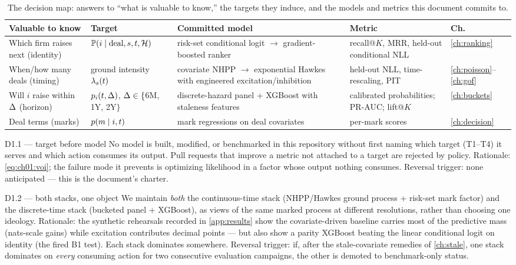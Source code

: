 \begin{table}[htbp]
\centering
\small
\begin{tabular}{p{} p{} p{} p{} p{}}
\toprule
\textbf{Valuable to know} & \textbf{Target} & \textbf{Committed model} &
\textbf{Metric} & \textbf{Ch.} \\
\midrule
Which firm raises next (identity) &
$\mathbb{P}(i \mid \text{deal}, s, t, \mathcal{H})$ &
risk-set conditional logit $\to$ gradient-boosted ranker &
recall@$K$, MRR, held-out conditional NLL & \ref{ch:ranking} \\
\addlinespace
When/how many deals (timing) &
ground intensity $\lambda_s(t)$ &
covariate NHPP $\to$ exponential Hawkes with engineered
excitation/inhibition &
held-out NLL, time-rescaling, PIT & \ref{ch:poisson}--\ref{ch:gof} \\
\addlinespace
Will $i$ raise within $\Delta$ (horizon) &
$p_i(t,\Delta)$, $\Delta\in\{$6M, 1Y, 2Y$\}$ &
discrete-hazard panel + XGBoost with staleness features &
calibrated probabilities; PR-AUC; lift@$K$ & \ref{ch:buckets} \\
\addlinespace
Deal terms (marks) &
$p(m \mid i, t)$ &
mark regressions on deal covariates &
per-mark scores & \ref{ch:decision} \\
\bottomrule
\end{tabular}
\caption{The decision map: answers to ``what is valuable to know,'' the
targets they induce, and the models and metrics this document commits to.}
\label{tab:ch01:map}
\end{table}

\begin{decision}{D1.1 --- target before model}
No model is built, modified, or benchmarked in this repository without first
naming which target (T1--T4) it serves and which action consumes its output.
Pull requests that improve a metric not attached to a target are rejected by
policy. Rationale: \cref{eq:ch01:voi}; the failure mode it prevents is
optimizing likelihood in a factor whose output nothing consumes.
Reversal trigger: none anticipated --- this is the document's charter.
\end{decision}

\begin{decision}{D1.2 --- both stacks, one object}
We maintain \emph{both} the continuous-time stack (NHPP/Hawkes ground
process + risk-set mark factor) and the discrete-time stack (bucketed
panel + XGBoost), as views of the same marked process at different
resolutions, rather than choosing one ideology. Rationale: the synthetic
rehearsals recorded in \cref{app:results} show the covariate-driven
baseline carries most of the predictive mass (nats-scale gains) while
excitation contributes decimal points --- but also show a parity XGBoost
beating the linear conditional logit on identity (the fired B1 test). Each
stack dominates somewhere. Reversal trigger: if, after the stale-covariate
remedies of \cref{ch:stale}, one stack dominates on \emph{every} consuming
action for two consecutive evaluation campaigns, the other is demoted to
benchmark-only status.
\end{decision}

